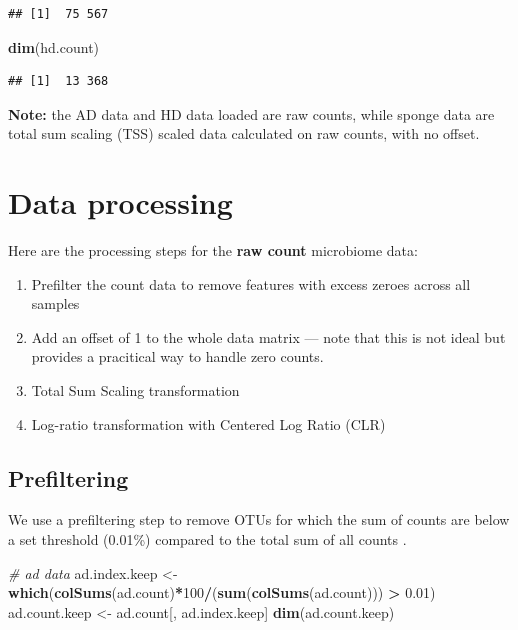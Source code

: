 \documentclass[]{book}
\newenvironment{Shaded}{\begin{snugshade}}{\end{snugshade}}
\newcommand{\KeywordTok}[1]{\textcolor[rgb]{0.13,0.29,0.53}{\textbf{#1}}}
\newcommand{\DecValTok}[1]{\textcolor[rgb]{0.00,0.00,0.81}{#1}}
\newcommand{\FloatTok}[1]{\textcolor[rgb]{0.00,0.00,0.81}{#1}}
\newcommand{\StringTok}[1]{\textcolor[rgb]{0.31,0.60,0.02}{#1}}
\newcommand{\CommentTok}[1]{\textcolor[rgb]{0.56,0.35,0.01}{\textit{#1}}}
\newcommand{\OperatorTok}[1]{\textcolor[rgb]{0.81,0.36,0.00}{\textbf{#1}}}
\newcommand{\NormalTok}[1]{#1}
\providecommand{\tightlist}{%
  \setlength{\itemsep}{0pt}\setlength{\parskip}{0pt}}
\begin{document}
\begin{verbatim}
## [1]  75 567
\end{verbatim}

\begin{Shaded}
\begin{Highlighting}[]
\KeywordTok{dim}\NormalTok{(hd.count)}
\end{Highlighting}
\end{Shaded}

\begin{verbatim}
## [1]  13 368
\end{verbatim}

\textbf{Note:} the AD data and HD data loaded are raw counts, while
sponge data are total sum scaling (TSS) scaled data calculated on raw
counts, with no offset.

\section{Data processing}\label{data-processing}

Here are the processing steps for the \textbf{raw count} microbiome
data:

\begin{enumerate}
\def\labelenumi{\arabic{enumi}.}
\tightlist
\item
  Prefilter the count data to remove features with excess zeroes across
  all samples\\
\item
  Add an offset of 1 to the whole data matrix --- note that this is not
  ideal but provides a pracitical way to handle zero counts.\\
\item
  Total Sum Scaling transformation\\
\item
  Log-ratio transformation with Centered Log Ratio (CLR)
\end{enumerate}

\subsection{Prefiltering}\label{prefiltering}

We use a prefiltering step to remove OTUs for which the sum of counts
are below a set threshold (0.01\%) compared to the total sum of all
counts \citep{arumugam2011enterotypes}.

\begin{Shaded}
\begin{Highlighting}[]
\CommentTok{# ad data}
\NormalTok{ad.index.keep <-}\StringTok{ }\KeywordTok{which}\NormalTok{(}\KeywordTok{colSums}\NormalTok{(ad.count)}\OperatorTok{*}\DecValTok{100}\OperatorTok{/}\NormalTok{(}\KeywordTok{sum}\NormalTok{(}\KeywordTok{colSums}\NormalTok{(ad.count))) }\OperatorTok{>}\StringTok{ }\FloatTok{0.01}\NormalTok{)}
\NormalTok{ad.count.keep <-}\StringTok{ }\NormalTok{ad.count[, ad.index.keep]}
\KeywordTok{dim}\NormalTok{(ad.count.keep)}
\end{Highlighting}
\end{Shaded}
\end{document}
